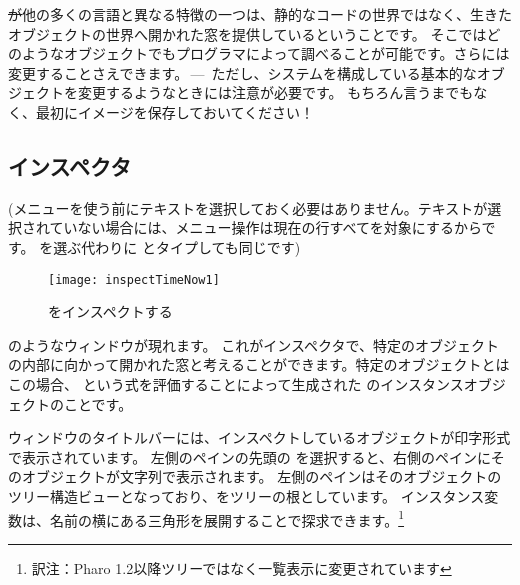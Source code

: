\documentclass[a4paper,10pt,twoside]{book}
\begin{document}
\st が他の多くの言語と異なる特徴の一つは、静的なコードの世界ではなく、生きたオブジェクトの世界へ開かれた窓を提供しているということです。
そこではどのようなオブジェクトでもプログラマによって調べることが可能です。さらには変更することさえできます。\,---\, ただし、システムを構成している基本的なオブジェクトを変更するようなときには注意が必要です。
もちろん言うまでもなく、最初にイメージを保存しておいてください！

\subsection{インスペクタ}

(メニューを使う前にテキストを選択しておく必要はありません。テキストが選択されていない場合には、メニュー操作は現在の行すべてを対象にするからです。
 を選ぶ代わりに  とタイプしても同じです)

\begin{figure}[btp]
\begin{center}
\texttt{[image: inspectTimeNow1]}
\end{center}
\caption{  をインスペクトする}
\end{figure}

 のようなウィンドウが現れます。
これがインスペクタで、特定のオブジェクトの内部に向かって開かれた窓と考えることができます。特定のオブジェクトとはこの場合、  という式を評価することによって生成された \mbox{} のインスタンスオブジェクトのことです。

ウィンドウのタイトルバーには、インスペクトしているオブジェクトが印字形式で表示されています。
左側のペインの先頭の  を選択すると、右側のペインにそのオブジェクトが文字列で表示されます。
左側のペインはそのオブジェクトのツリー構造ビューとなっており、\self をツリーの根としています。
インスタンス変数は、名前の横にある三角形を展開することで探求できます。\footnote{訳注：Pharo 1.2以降ツリーではなく一覧表示に変更されています}
\end{document}
